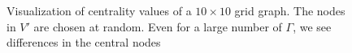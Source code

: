 \documentclass[envcountsame]{llncs}
\begin{document}
\begin{figure}[t]
{}
\caption{Visualization of centrality values of a $10 \times 10$ grid graph. The nodes in $V'$ are chosen at random. Even for a large number of $\Gamma$, we see differences in the central nodes}
\label{fig:grid}
\end{figure}
\end{document}
